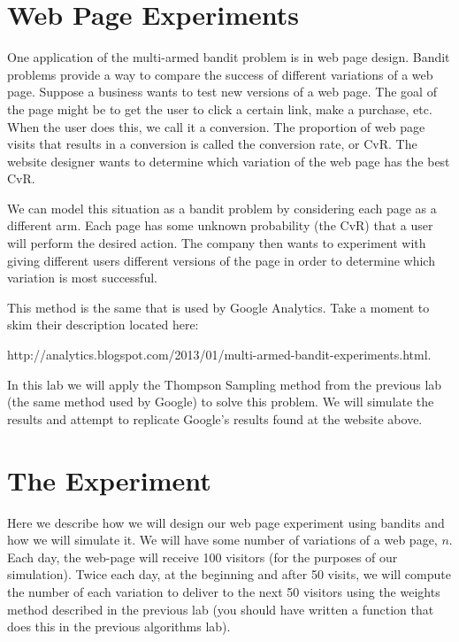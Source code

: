 
\section*{Web Page Experiments}
One application of the multi-armed bandit problem is in web page design.  Bandit problems provide a way to compare the success of different variations of a web page.  Suppose a business wants to test new versions of a web page.  The goal of the page might be to get the user to click a certain link, make a purchase, etc.  When the user does this, we call it a conversion.  The proportion of web page visits that results in a conversion is called the conversion rate, or CvR.  The website designer wants to determine which variation of the web page has the best CvR.

We can model this situation as a bandit problem by considering each page as a different arm.  Each page has some unknown probability (the CvR) that a  user will perform the desired action.  The company then wants to experiment with giving different users different versions of the page in order to determine which variation is most successful.

This method is the same that is used by Google Analytics.  Take a moment to skim their description located here:

\begin{center} http://analytics.blogspot.com/2013/01/multi-armed-bandit-experiments.html.
\end{center}

In this lab we will apply the Thompson Sampling method from the previous lab (the same method used by Google) to solve this problem.  We will simulate the results and attempt to replicate Google's results found at the website above.  

\section*{The Experiment}
Here we describe how we will design our web page experiment using bandits and how we will simulate it.  We will have some number of variations of a web page, $n$.  Each day, the web-page will receive 100 visitors (for the purposes of our simulation).  Twice each day, at the beginning and after 50 visits, we will compute the number of each variation to deliver to the next 50 visitors using the weights method described in the previous lab (you should have written a function that does this in the previous algorithms lab).  

